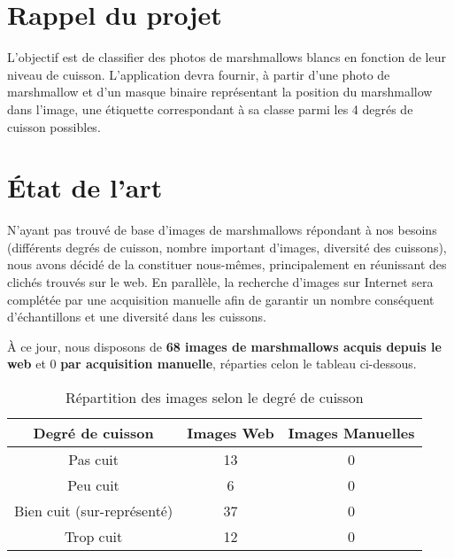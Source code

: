 \documentclass[11pt, openright]{book}
\begin{document}



    
\pagestyle{fancy}
    \newpage


\section{Rappel du projet}
    L’objectif est de classifier des photos de marshmallows blancs en fonction de leur niveau de cuisson. L’application devra fournir, à partir d’une photo de marshmallow et d’un masque binaire représentant la position du marshmallow dans l’image, une étiquette correspondant à sa classe parmi les 4 degrés de cuisson possibles.

\section{État de l’art}
    N’ayant pas trouvé de base d’images de marshmallows répondant à nos besoins (différents degrés de cuisson, nombre important d’images, diversité des cuissons), nous avons décidé de la constituer nous-mêmes, principalement en réunissant des clichés trouvés sur le web. En parallèle, la recherche d’images sur Internet sera complétée par une acquisition manuelle afin de garantir un nombre conséquent d’échantillons et une diversité dans les cuissons.
    
    À ce jour, nous disposons de \textbf{68 images de marshmallows acquis depuis le web} et 0 \textbf{par acquisition manuelle}, réparties celon le tableau ci-dessous.
    \begin{table}[h]
        \centering
        \begin{tabular}{|c|c|c|}
            \hline
            \textbf{Degré de cuisson} & \textbf{Images Web} & \textbf{Images Manuelles} \\
            \hline
            Pas cuit & 13 & 0 \\
            Peu cuit & 6 & 0 \\
            Bien cuit (sur-représenté) & 37 & 0 \\
            Trop cuit & 12 & 0 \\
            \hline
        \end{tabular}
        \caption{Répartition des images selon le degré de cuisson}
        \label{tab:repartition_cuisson}
    \end{table}
    
\end{document}
